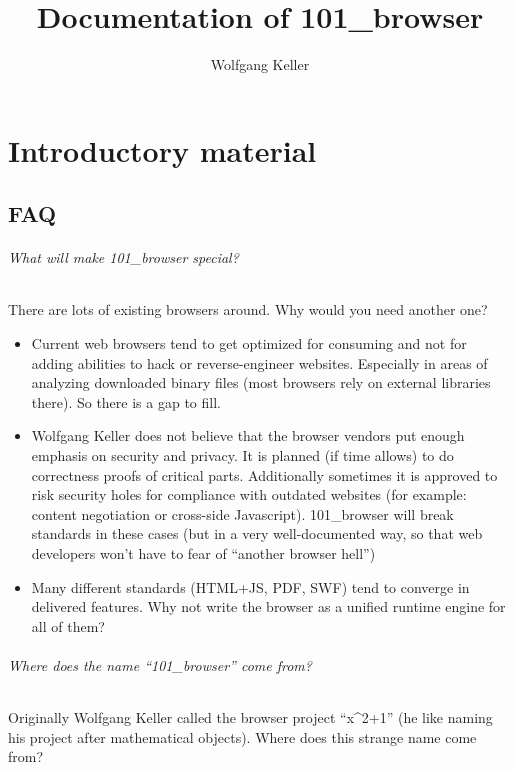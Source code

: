 \documentclass[10pt]{scrbook}
\author{Wolfgang Keller}
\title{Documentation of 101\_browser}
\begin{document}
\maketitle
\tableofcontents

\part{Introductory material}

\chapter{FAQ}

\paragraph{What will make 101\_browser special?}

There are lots of existing browsers around. Why would you need another one?
\begin{itemize}
\item Current web browsers tend to get optimized for consuming and not for adding abilities to hack or reverse-engineer websites. Especially in areas of analyzing downloaded binary files (most browsers rely on external libraries there). So there is a gap to fill.
\item Wolfgang Keller does not believe that the browser vendors put enough emphasis on security and privacy. It is planned (if time allows) to do correctness proofs of critical parts. Additionally sometimes it is approved to risk security holes for compliance with outdated websites (for example: content negotiation or cross-side Javascript). 101\_browser will break standards in these cases (but in a very well-documented way, so that web developers won't have to fear of "`another browser hell"')
\item Many different standards (HTML+JS, PDF, SWF) tend to converge in delivered features. Why not write the browser as a unified runtime engine for all of them?
\end{itemize}

\paragraph{Where does the name "`101\_browser"' come from?}

Originally Wolfgang Keller called the browser project "`x\^{}2+1"' (he like naming his project after mathematical objects). Where does this strange name come from?
\end{document}
